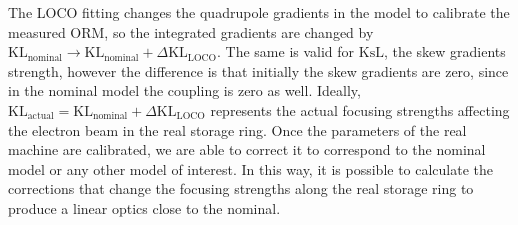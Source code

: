 The LOCO fitting changes the quadrupole gradients in the model to calibrate the measured ORM, so the integrated gradients are changed by $\mathrm{KL}_{\mathrm{nominal}} \rightarrow \mathrm{KL}_{\mathrm{nominal}} + \Delta\mathrm{KL}_{\mathrm{LOCO}}$. The same is valid for $\mathrm{KsL}$, the skew gradients strength, however the difference is that initially the skew gradients are zero, since in the nominal model the coupling is zero as well. Ideally, $\mathrm{KL}_{\mathrm{actual}} = \mathrm{KL}_{\mathrm{nominal}} + \Delta\mathrm{KL}_{\mathrm{LOCO}}$ represents the actual focusing strengths affecting the electron beam in the real storage ring. Once the parameters of the real machine are calibrated, we are able to correct it to correspond to the nominal model or any other model of interest. In this way, it is possible to calculate the corrections that change the focusing strengths along the real storage ring to produce a linear optics close to the nominal.

